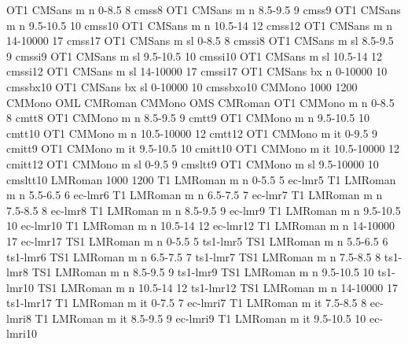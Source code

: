 \declarefont OT1 CMSans m   n  0-8.5     8  cmss8
\declarefont OT1 CMSans m   n  8.5-9.5   9  cmss9
\declarefont OT1 CMSans m   n  9.5-10.5  10 cmss10
\declarefont OT1 CMSans m   n  10.5-14   12 cmss12
\declarefont OT1 CMSans m   n  14-10000  17 cmss17
\declarefont OT1 CMSans m   sl 0-8.5     8  cmssi8
\declarefont OT1 CMSans m   sl 8.5-9.5   9  cmssi9
\declarefont OT1 CMSans m   sl 9.5-10.5  10 cmssi10
\declarefont OT1 CMSans m   sl 10.5-14   12 cmssi12
\declarefont OT1 CMSans m   sl 14-10000  17 cmssi17
%
\declarefont OT1 CMSans bx  n  0-10000   10 cmssbx10
\declarefont OT1 CMSans bx  sl 0-10000   10 cmssbxo10 %
%
%
\declarefontfamily CMMono 1000 1200
\fontmapfamily CMMono OML CMRoman
\fontmapfamily CMMono OMS CMRoman
\declarefont OT1 CMMono m   n  0-8.5      8  cmtt8
\declarefont OT1 CMMono m   n  8.5-9.5    9  cmtt9
\declarefont OT1 CMMono m   n  9.5-10.5   10 cmtt10
\declarefont OT1 CMMono m   n  10.5-10000 12 cmtt12
\declarefont OT1 CMMono m   it 0-9.5      9  cmitt9  %
\declarefont OT1 CMMono m   it 9.5-10.5   10 cmitt10
\declarefont OT1 CMMono m   it 10.5-10000 12 cmitt12 %
\declarefont OT1 CMMono m   sl 0-9.5      9  cmsltt9  %
\declarefont OT1 CMMono m   sl 9.5-10000  10 cmsltt10
%
%
\declarefontfamily LMRoman 1000 1200
\declarefont T1 LMRoman m   n  0-5.5     5  ec-lmr5
\declarefont T1 LMRoman m   n  5.5-6.5   6  ec-lmr6
\declarefont T1 LMRoman m   n  6.5-7.5   7  ec-lmr7
\declarefont T1 LMRoman m   n  7.5-8.5   8  ec-lmr8
\declarefont T1 LMRoman m   n  8.5-9.5   9  ec-lmr9
\declarefont T1 LMRoman m   n  9.5-10.5  10 ec-lmr10
\declarefont T1 LMRoman m   n  10.5-14   12 ec-lmr12
\declarefont T1 LMRoman m   n  14-10000  17 ec-lmr17
\declarefont TS1 LMRoman m  n  0-5.5     5  ts1-lmr5
\declarefont TS1 LMRoman m  n  5.5-6.5   6  ts1-lmr6
\declarefont TS1 LMRoman m  n  6.5-7.5   7  ts1-lmr7
\declarefont TS1 LMRoman m  n  7.5-8.5   8  ts1-lmr8
\declarefont TS1 LMRoman m  n  8.5-9.5   9  ts1-lmr9
\declarefont TS1 LMRoman m  n  9.5-10.5  10 ts1-lmr10
\declarefont TS1 LMRoman m  n  10.5-14   12 ts1-lmr12
\declarefont TS1 LMRoman m  n  14-10000  17 ts1-lmr17
\declarefont T1 LMRoman m   it 0-7.5      7  ec-lmri7
\declarefont T1 LMRoman m   it 7.5-8.5    8  ec-lmri8
\declarefont T1 LMRoman m   it 8.5-9.5    9  ec-lmri9
\declarefont T1 LMRoman m   it 9.5-10.5   10 ec-lmri10
